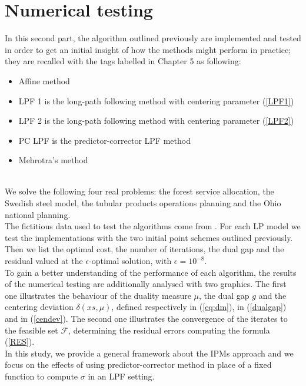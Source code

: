 \documentclass[a4paper,10 pt,titlepage,twoside]{report}
\theoremstyle{plain}
\theoremstyle{definition}
\theoremstyle{remark}
\begin{document}
{{\chapter{Numerical testing}
In this second part, the algorithm outlined previously are implemented and tested in order to get an initial insight of how the methods might
perform in practice; they are recalled with the tags labelled in Chapter 5 as following:
\begin{itemize}
	\item Affine method
	\item LPF 1 is the long-path following method with centering parameter (\ref{LPF1})
	\item LPF 2 is the long-path following method with centering parameter (\ref{LPF2})
	\item PC LPF is the predictor-corrector LPF method 
	\item Mehrotra's method
\end{itemize}\\ We solve the following four real problems: the forest service allocation, the Swedish steel model, the tubular products operations planning and the Ohio national planning.\\
The fictitious data used to test the algorithms come from \cite{RR}.
For each LP model we test the implementations with the two initial point schemes outlined previously. Then we list the optimal cost, the number of iterations, the dual gap and the residual valued at the $\epsilon$-optimal solution, with $\epsilon= 10^{-8}$.\\ To gain a better understanding of the performance of each algorithm, the results of the numerical testing are additionally analysed with two graphics. The first one illustrates the behaviour of the duality measure $\mu$, the dual gap $g$ and the centering deviation $\delta(xs, \mu)$, defined respectively in (\ref{eq:dm}), in (\ref{dualgap}) and in (\ref{cendev}). The second one illustrates the convergence of the iterates to the feasible set $\mathcal{F}$, determining the residual errors computing the formula (\ref{RES}).\\
In this study, we provide a general framework about the IPMs approach and we focus on the effects of using predictor-corrector method in place of a fixed function to compute $\sigma$ in an LPF setting. 
}}
\end{document}
